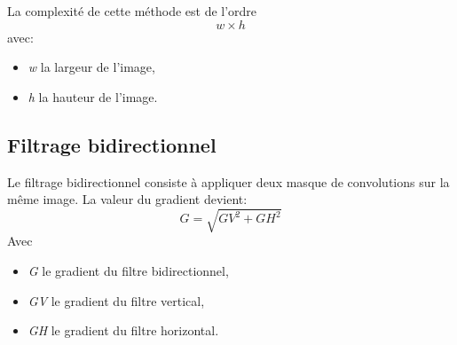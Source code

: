 \documentclass[11pt]{article}
\begin{document}
	La complexité de cette méthode est de l’ordre \[w \times h\] avec:
	\begin{itemize}
		\item \textit{w} la largeur de l’image,
		\item \textit{h} la hauteur de l’image. 
	\end{itemize}

	\subsection{Filtrage bidirectionnel}

	Le filtrage bidirectionnel consiste à appliquer deux masque de convolutions sur la même image.
	La valeur du gradient devient: 
	\[G = \sqrt{GV^2 + GH^2}\]
	Avec 
	\begin{itemize}
		\item \textit{G} le gradient du filtre bidirectionnel,
		\item \textit{GV} le gradient du filtre vertical,
		\item \textit{GH} le gradient du filtre horizontal.
	\end{itemize}
\end{document}
